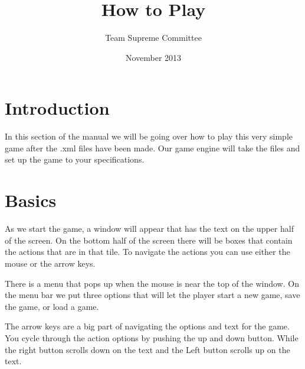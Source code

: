 \documentclass[11pt]{article}
\begin{document}
\title{How to Play}
\author{Team Supreme Committee}
\date{November 2013}
\maketitle


\section{Introduction}

In this section of the manual we will be going over how to play this very simple game after the .xml files have been made. Our game engine will take the files and set up the game to your specifications. 

\section{Basics}

As we start the game, a window will appear that has the text on the upper half of the screen. On the bottom half of the screen there will be boxes that contain the actions that are in that tile. To navigate the actions you can use either the mouse or the arrow keys.

There is a menu that pops up when the mouse is near the top of the window. On the menu bar we put three options that will let the player start a new game, save the game, or load a game.

The arrow keys are a big part of navigating the options and text for the game. You cycle through the action options by pushing the up and down button. While the right button scrolls down on the text and the Left button scrolls up on the text.
\end{document}

